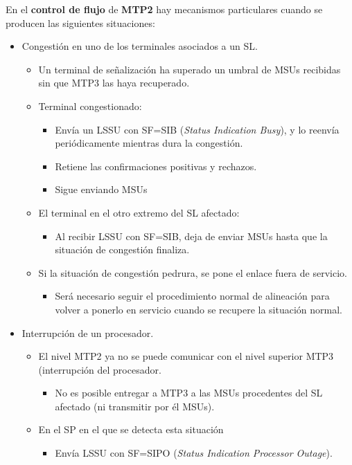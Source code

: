 \documentclass[10pt,portrait, twocolumn]{article}
\begin{document}
En el \textbf{control de flujo} de \textbf{MTP2} hay mecanismos particulares cuando se producen las siguientes situaciones:
	\begin{itemize}
	\item Congestión en uno de los terminales asociados a un SL.
		\begin{itemize}
		\item Un terminal de señalización ha superado un umbral de MSUs recibidas sin que MTP3 las haya recuperado.
		\item Terminal congestionado:
			\begin{itemize}
			\item Envía un LSSU con SF=SIB (\textit{Status Indication Busy}), y lo reenvía periódicamente mientras dura la congestión.
			\item Retiene las confirmaciones positivas y rechazos.
			\item Sigue enviando MSUs
			\end{itemize}
		\item El terminal en el otro extremo del SL afectado:
			\begin{itemize}
			\item Al recibir LSSU con SF=SIB, deja de enviar MSUs hasta que la situación de congestión finaliza.
			\end{itemize}
		\item Si la situación de congestión pedrura, se pone el enlace fuera de servicio.
			\begin{itemize}
			\item Será necesario seguir el procedimiento normal de alineación para volver a ponerlo en servicio cuando se recupere la situación normal.
			\end{itemize}
		\end{itemize}
	\item Interrupción de un procesador.
		\begin{itemize}
		\item El nivel MTP2 ya no se puede comunicar con el nivel superior MTP3 (interrupción del procesador.
			\begin{itemize}
			\item No es posible entregar a MTP3 a las MSUs procedentes del SL afectado (ni transmitir por él MSUs).
			\end{itemize}
		\item En el SP en el que se detecta esta situación
			\begin{itemize}
			\item Envía LSSU con SF=SIPO (\textit{Status Indication Processor Outage}).

\end{itemize}
\end{itemize}
\end{itemize}
\end{document}
